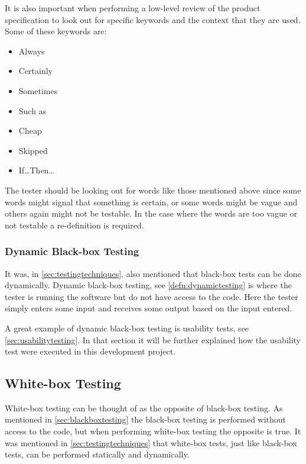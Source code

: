 \documentclass[../../master.tex]{subfiles}
\begin{document}
It is also important when performing a low-level review of the product specification to look out for specific keywords and the context that they are used.
Some of these keywords are:

\begin{multicols}{2}
\begin{itemize}
	\item Always
	\item Certainly
	\item Sometimes
	\item Such as
	\item Cheap
	\item Skipped
	\item If\ldots Then\ldots
\end{itemize}
\end{multicols}

The tester should be looking out for words like those mentioned above since some words might signal that something is certain, or some words might be vague and others again might not be testable.
In the case where the words are too vague or not testable a re-definition is required. \cite{SoftwareTesting}

\subsubsection{Dynamic Black-box Testing}
It was, in \cref{sec:testingtechniques}, also mentioned that black-box tests can be done dynamically.
Dynamic black-box testing, see \cref{defn:dynamictesting} is where the tester is running the software but do not have access to the code.
Here the tester simply enters some input and receives some output based on the input entered. \cite{SoftwareTesting}

A great example of dynamic black-box testing is usability tests, see \cref{sec:usabilitytesting}.
In that section it will be further explained how the usability test were executed in this development project.

\subsection{White-box Testing} \label{sec:whiteboxtesting}
White-box testing can be thought of as the opposite of black-box testing.
As mentioned in \cref{sec:blackboxtesting} the black-box testing is performed without access to the code, but when performing white-box testing the opposite is true.
It was mentioned in \cref{sec:testingtechniques} that white-box tests, just like black-box tests, can be performed statically and dynamically.
\end{document}
